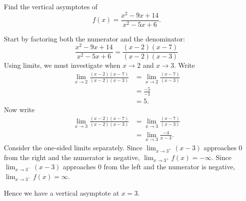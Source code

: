 \documentclass{ximera}
\begin{document}
\begin{example}
Find the vertical asymptotes of 
\[
f(x) = \frac{x^2-9x+14}{x^2-5x+6}.
\]

\begin{explanation}
Start by factoring both the numerator and the denominator:
\[
\frac{x^2-9x+14}{x^2-5x+6} = \frac{(x-2)(x-7)}{(x-2)(x-3)}
\]
Using limits, we must investigate when $x\to 2$ and $x\to 3$. Write
\begin{align*}
\displaystyle\lim_{x\to 2} \frac{(x-2)(x-7)}{(x-2)(x-3)} &= \lim_{x\to 2} \frac{(x-7)}{(x-3)}\\
&= \frac{-5}{-1}\\
&=5.
\end{align*}
Now write
\begin{align*}
\lim_{x\to 3} \frac{(x-2)(x-7)}{(x-2)(x-3)} &= \lim_{x\to 3} \frac{(x-7)}{(x-3)}\\
&= \lim_{x\to 3}\frac{-4}{x-3}.
\end{align*}
Consider the one-sided limits separately.  Since $\displaystyle\lim_{x\to 3^+}
(x-3)$ approaches $0$ from the right and the numerator is negative,
$\displaystyle\lim_{x\to 3^+} f(x) = -\infty$. Since $\displaystyle\lim_{x\to 3^-} (x-3)$
approaches $0$ from the left and the numerator is negative,
$\displaystyle\lim_{x\to 3^-} f(x) = \infty$.
\begin{image}
\end{image}
Hence we have a vertical asymptote at $x=3$.
\end{explanation}
\end{example}
\end{document}
